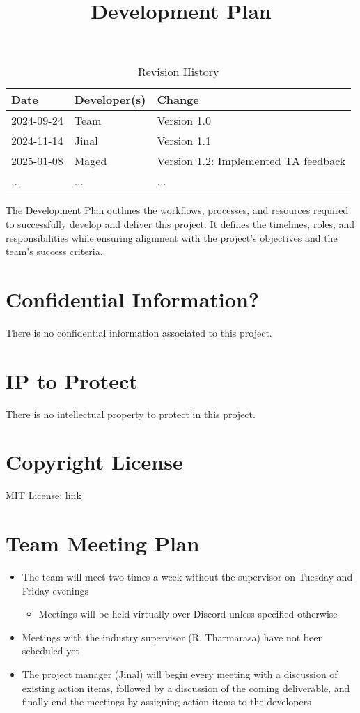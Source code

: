 \documentclass{article}
\title{Development Plan\\\progname}
\author{\authname}
\date{}
\begin{document}
\maketitle

\begin{table}[hp]
\caption{Revision History} \label{TblRevisionHistory}
\begin{tabularx}{\textwidth}{llX}
\toprule
\textbf{Date} & \textbf{Developer(s)} & \textbf{Change}\\
\midrule
2024-09-24 & Team & Version 1.0 \\
2024-11-14 & Jinal & Version 1.1 \\
2025-01-08 & Maged & Version 1.2: Implemented TA feedback \\
... & ... & ...\\
\bottomrule
\end{tabularx}
\end{table}

\newpage{}

The Development Plan outlines the workflows, processes, and resources required to successfully develop and deliver this project. It defines the timelines, roles, and responsibilities while ensuring alignment with the project’s objectives and the team's success criteria.

\section{Confidential Information?}
There is no confidential information associated to this project.

\section{IP to Protect}
There is no intellectual property to protect in this project.

\section{Copyright License}
MIT License: \href{https://github.com/jinalkast/room8/blob/main/LICENSE}{\underline{link}} 

\section{Team Meeting Plan}
\begin{itemize}
\item The team will meet two times a week without the supervisor on Tuesday and Friday evenings
\begin{itemize}
\item Meetings will be held virtually over Discord unless specified otherwise
\end{itemize}
\item Meetings with the industry supervisor (R. Tharmarasa) have not been scheduled yet
\item The project manager (Jinal) will begin every meeting with a discussion of existing action items,
followed by a discussion of the coming deliverable, and finally end the meetings by assigning
action items to the developers
\end{itemize}
\end{document}
